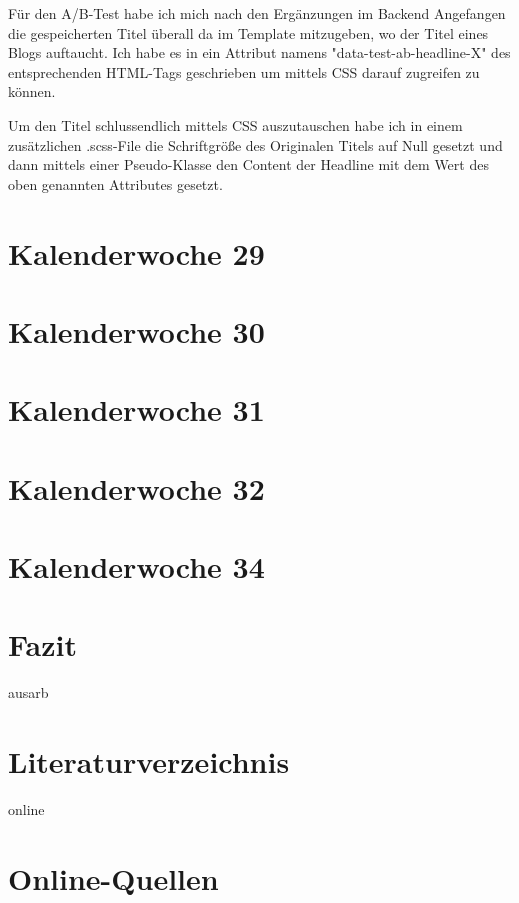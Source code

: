 \documentclass[11pt]{article} %
\begin{document}
Für den A/B-Test habe ich mich nach den Ergänzungen im Backend Angefangen die gespeicherten Titel überall da im Template mitzugeben, wo der Titel eines Blogs auftaucht. Ich habe es in ein Attribut namens "data-test-ab-headline-X" des entsprechenden HTML-Tags geschrieben um mittels CSS darauf zugreifen zu können.

Um den Titel schlussendlich mittels CSS auszutauschen habe ich in einem zusätzlichen .scss-File die Schriftgröße des Originalen Titels auf Null gesetzt und dann mittels einer Pseudo-Klasse den Content der Headline mit dem Wert des oben genannten Attributes gesetzt. 

\section{Kalenderwoche 29} \label{sec:kw2}



\section{Kalenderwoche 30} \label{sec:kw3}
\section{Kalenderwoche 31} \label{sec:kw3}
\section{Kalenderwoche 32} \label{sec:kw3}
\section{Kalenderwoche 34} \label{sec:kw3}
\section{Fazit} \label{sec:faz}

\newpage


\newpage

\listoffigures %
\listoftables %
%
\begin{btSect}{ausarb}
\section*{Literaturverzeichnis}
\btPrintCited
\end{btSect}
\begin{btSect}{online}
\section*{Online-Quellen}
\btPrintCited
\end{btSect}
\end{document}
